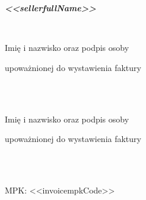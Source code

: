 \documentclass[12pt]{article}
\begin{document}
    \begin{small}
        \begin{minipage}[t]{.4\textwidth}
            \centerline{
                \textbf{\emph{<<sellerfullName>>}
                }}
            \ \\
            \vspace{-4ex}
            \hline
            \vspace{.5ex}
            \scriptsize{
                \centerline{Imię i nazwisko oraz podpis osoby}
                \centerline{upoważnionej do wystawienia faktury}
            }
        \end{minipage}
        \hfill
        \begin{minipage}[t]{.4\textwidth}
            \ \\ \\
            \vspace{-4ex}
            \hline
            \vspace{.5ex}
            \scriptsize{
                \centerline{Imię i nazwisko oraz podpis osoby}
                \centerline{upoważnionej do wystawienia faktury}
            }
        \end{minipage}

        \ \\
        \ \\

        \begin{small}
            \small{\centerline{{MPK: <<invoicempkCode>>}}}
        \end{small}


    \end{small}
\end{document}
